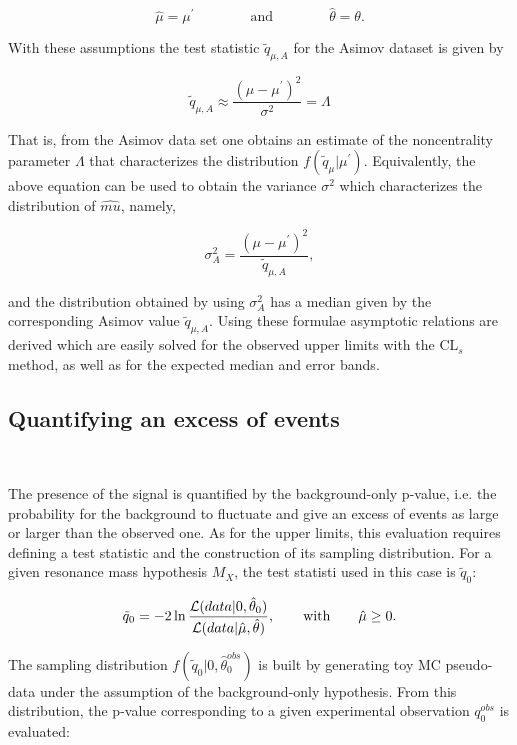 \begin{equation}
\hat{\mu} = \mu^\prime \qquad\qquad \mathrm{and} \qquad\qquad \hat{\theta} = \theta.
\end{equation}

With these assumptions the test statistic $\tilde{q}_{\mu,A}$ for the Asimov dataset is given by 

\begin{equation}
\tilde{q}_{\mu,A} \approx \frac{(\mu-\mu^\prime)^2}{\sigma^2} = \Lambda
\end{equation}

That is, from the Asimov data set one obtains an estimate of the noncentrality parameter $\Lambda$ that characterizes the distribution $f(\tilde{q}_\mu|\mu^\prime)$.
Equivalently, the above equation can be used to obtain the variance $\sigma^2$ which characterizes the distribution of $\hat{mu}$, namely,

\begin{equation}
\sigma_A^2 = \frac{(\mu-\mu^\prime)^2}{\tilde{q}_{\mu,A}},
\end{equation}

and the distribution obtained by using $\sigma_A^2$ has a median given by the corresponding Asimov value $\tilde{q}_{\mu,A}$. 
Using these formulae asymptotic relations are derived which are easily solved for the observed upper limits with the $\mathrm{CL}_s$ method,
as well as for the expected median and error bands.

\subsection{Quantifying an excess of events}~\label{subsec:pvalue}

The presence of the signal is quantified by the background-only p-value, i.e. the probability for the background to fluctuate
and give an excess of events as large or larger than the observed one.
As for the upper limits, this evaluation requires defining a test statistic and the construction of its sampling distribution.
For a given resonance mass hypothesis $M_X$, the test statisti used in this case is $\tilde{q}_0$:

\begin{equation}
\tilde{q}_0 = -2\ln\frac{{\cal L}(data | 0,\hat{\theta}_0)}{{\cal L}( data | \hat{\mu},\hat{\theta})},\qquad \mathrm{with} \qquad \hat{\mu} \geq 0.
\end{equation}

The sampling distribution $f(\tilde{q}_0|0,\hat{\theta}_0^{obs})$ is built by generating toy MC pseudo-data under the assumption of the background-only hypothesis.
From this distribution, the p-value corresponding to a given experimental observation $q_0^{obs}$ is evaluated:

